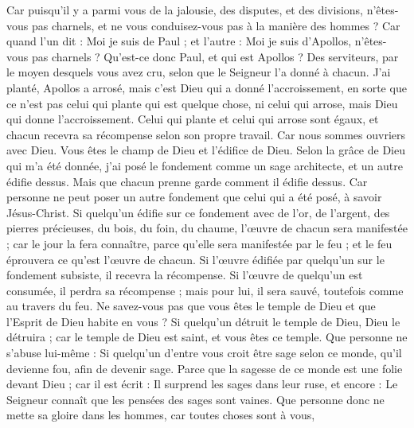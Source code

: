 \begin{multicols}{2}
Car puisqu'il y a parmi vous de la jalousie, des disputes, et des divisions, n'êtes-vous pas charnels, et ne vous conduisez-vous pas à la manière des hommes ?
Car quand l'un dit : Moi je suis de Paul ; et l'autre : Moi je suis d'Apollos, n'êtes-vous pas charnels ?
Qu'est-ce donc Paul, et qui est Apollos ? Des serviteurs, par le moyen desquels vous avez cru, selon que le Seigneur l'a donné à chacun.
J'ai planté, Apollos a arrosé, mais c'est Dieu qui a donné l'accroissement,
en sorte que ce n'est pas celui qui plante qui est quelque chose, ni celui qui arrose, mais Dieu qui donne l'accroissement.
Celui qui plante et celui qui arrose sont égaux, et chacun recevra sa récompense selon son propre travail.
Car nous sommes ouvriers avec Dieu. Vous êtes le champ de Dieu et l'édifice de Dieu.
Selon la grâce de Dieu qui m'a été donnée, j'ai posé le fondement comme un sage architecte, et un autre édifie dessus. Mais que chacun prenne garde comment il édifie dessus.
Car personne ne peut poser un autre fondement que celui qui a été posé, à savoir Jésus-Christ.
Si quelqu'un édifie sur ce fondement avec de l'or, de l'argent, des pierres précieuses, du bois, du foin, du chaume, l'œuvre de chacun sera manifestée ;
car le jour la fera connaître, parce qu'elle sera manifestée par le feu ; et le feu éprouvera ce qu'est l'œuvre de chacun.
Si l'œuvre édifiée par quelqu'un sur le fondement subsiste, il recevra la récompense.
Si l'œuvre de quelqu'un est consumée, il perdra sa récompense ; mais pour lui, il sera sauvé, toutefois comme au travers du feu.
Ne savez-vous pas que vous êtes le temple de Dieu et que l'Esprit de Dieu habite en vous ?
Si quelqu'un détruit le temple de Dieu, Dieu le détruira ; car le temple de Dieu est saint, et vous êtes ce temple.
Que personne ne s'abuse lui-même : Si quelqu'un d'entre vous croit être sage selon ce monde, qu'il devienne fou, afin de devenir sage.
Parce que la sagesse de ce monde est une folie devant Dieu ; car il est écrit : Il surprend les sages dans leur ruse,
et encore : Le Seigneur connaît que les pensées des sages sont vaines.
Que personne donc ne mette sa gloire dans les hommes, car toutes choses sont à vous,

\end{multicols}
